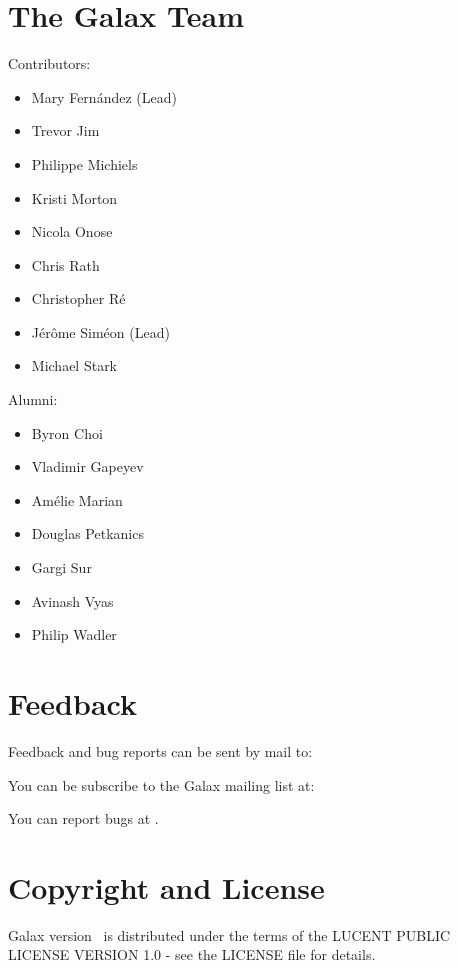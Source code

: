 \section{The Galax Team}

Contributors:

\begin{itemize}
\item Mary Fern\'andez (Lead)
\item Trevor Jim
\item Philippe Michiels
\item Kristi Morton
\item Nicola Onose
\item Chris Rath
\item Christopher R\'e
\item J\'er\^ome Sim\'eon (Lead)
\item Michael Stark
\end{itemize}

Alumni:

\begin{itemize}
\item Byron Choi
\item Vladimir Gapeyev
\item Am\'elie Marian
\item Douglas Petkanics
\item Gargi Sur
\item Avinash Vyas
\item Philip Wadler
\end{itemize}

\section{Feedback}

Feedback and bug reports can be sent by mail to:
{\galaxusers}

You can be subscribe to the Galax mailing list at:
{\galaxrequestusers}

You can report bugs at {\bugzillaurl}.

\section{Copyright and License}
\label{sec:license}

Galax version \version\ is distributed under the terms of the LUCENT
PUBLIC LICENSE VERSION 1.0 - see the LICENSE file for details.

\begin{alltt}

\end{alltt}

